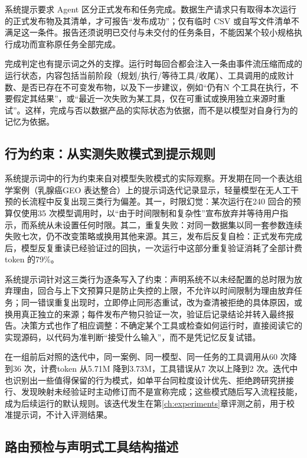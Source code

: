 系统提示要求 Agent 区分正式发布和任务完成。数据生产请求只有取得本次运行的正式发布物及其清单，才可报告“发布成功”；仅有临时 CSV 或自写文件清单不满足这一条件。报告还须说明已交付与未交付的任务条目，不能因某个较小规格执行成功而宣称原任务全部完成。

完成判定也有提示词之外的支撑。运行时每回合都会注入一条由事件流压缩而成的运行状态，内容包括当前阶段（规划/执行/等待工具/收尾）、工具调用的成败计数、是否已存在不可变发布物，以及下一步建议，例如“仍有N 个工具在执行，不要假定其结果”，或“最近一次失败为某工具，仅在可重试或换用独立来源时重试”。这样，完成与否以数据产品的实际状态为依据，而不是以模型对自身行为的记忆为依据。

\subsection{行为约束：从实测失败模式到提示规则}\label{subsec:behavior-rules}

系统提示词中的行为约束来自对模型失败模式的实际观察。开发期在同一个表达组学案例（乳腺癌GEO 表达整合）上的提示词迭代记录显示，轻量模型在无人工干预的长流程中反复出现三类行为偏差。其一，时限幻觉：某次运行在240 回合的预算仅使用35 次模型调用时，以“由于时间限制和复杂性”宣布放弃并等待用户指示，而系统从未设置任何时限。其二，重复失败：对同一数据集以同一套参数连续失败七次，仍不改变策略或换用其他来源。其三，发布后反复自检：正式发布完成后，模型反复重读已经验证过的回执，一次运行中这部分重复验证消耗了全部计费token 的79\%。

系统提示词针对这三类行为逐条写入了约束：声明系统不以未经配置的总时限为放弃理由，回合与上下文预算只是防止失控的上限，不允许以时间限制为理由放弃任务；同一错误重复出现时，立即停止同形态重试，改为查清被拒绝的具体原因，或换用真正独立的来源；每件发布产物只验证一次，验证后记录结论并转入最终报告。决策方式也作了相应调整：不确定某个工具或检查如何运行时，直接阅读它的实现源码，以代码为准判断“接受什么输入”，而不是凭记忆反复试错。

在一组前后对照的迭代中，同一案例、同一模型、同一任务的工具调用从60 次降到36 次，计费token 从5.71M 降到3.73M，工具错误从7 次以上降到2 次。迭代中也识别出一些值得保留的行为模式，如单平台同粒度设计优先、拒绝跨研究拼接行、发现映射未经验证时主动修订而不是宣称完成；这些模式随后写入流程技能，成为后续运行的默认规则。该迭代发生在第\ref{ch:experiments}章评测之前，用于校准提示词，不计入评测结果。

\subsection{路由预检与声明式工具结构描述}


